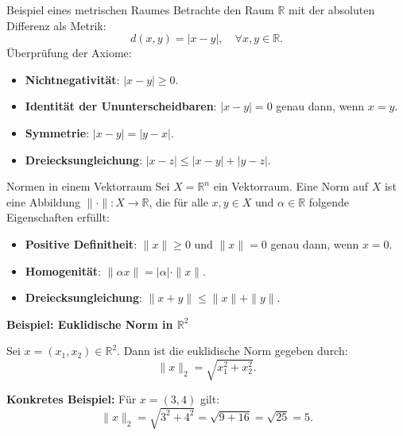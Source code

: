 \documentclass{beamer}
\begin{document}
  \begin{frame}{Beispiel eines metrischen Raumes}
    Betrachte den Raum \( \mathbb{R} \) mit der absoluten Differenz als Metrik:
    \[
    d(x, y) = |x - y|, \quad \forall x, y \in \mathbb{R}.
    \]
    Überprüfung der Axiome:
    \begin{itemize}
      \item \textbf{Nichtnegativität}: \( |x - y| \geq 0 \).
      \item \textbf{Identität der Ununterscheidbaren}: \( |x - y| = 0 \) genau dann, wenn \( x = y \).
      \item \textbf{Symmetrie}: \( |x - y| = |y - x| \).
      \item \textbf{Dreiecksungleichung}: \( |x - z| \leq |x - y| + |y - z| \).
    \end{itemize}
  \end{frame}
  

  \begin{frame}{Normen in einem Vektorraum}
    Sei \( X = \mathbb{R}^n \) ein Vektorraum. Eine Norm auf \( X \) ist eine Abbildung \( \| \cdot \| : X \rightarrow \mathbb{R} \), 
    die für alle \( x, y \in X \) und \( \alpha \in \mathbb{R} \) folgende Eigenschaften erfüllt:
    \begin{itemize}
      \item \textbf{Positive Definitheit}: \( \|x\| \geq 0 \) und \( \|x\| = 0 \) genau dann, wenn \( x = 0 \).
      \item \textbf{Homogenität}: \( \|\alpha x\| = |\alpha| \cdot \|x\| \).
      \item \textbf{Dreiecksungleichung}: \( \|x + y\| \leq \|x\| + \|y\| \).
    \end{itemize}
  
    \vspace{0.5cm}
    \textbf{Beispiel: Euklidische Norm in \( \mathbb{R}^2 \)}
  
    Sei \( x = (x_1, x_2) \in \mathbb{R}^2 \). Dann ist die euklidische Norm gegeben durch:
    \[
    \|x\|_2 = \sqrt{x_1^2 + x_2^2}.
    \]
  
    \textbf{Konkretes Beispiel:} Für \( x = (3, 4) \) gilt:
    \[
    \|x\|_2 = \sqrt{3^2 + 4^2} = \sqrt{9 + 16} = \sqrt{25} = 5.
    \]
  \end{frame}
  
\end{document}

